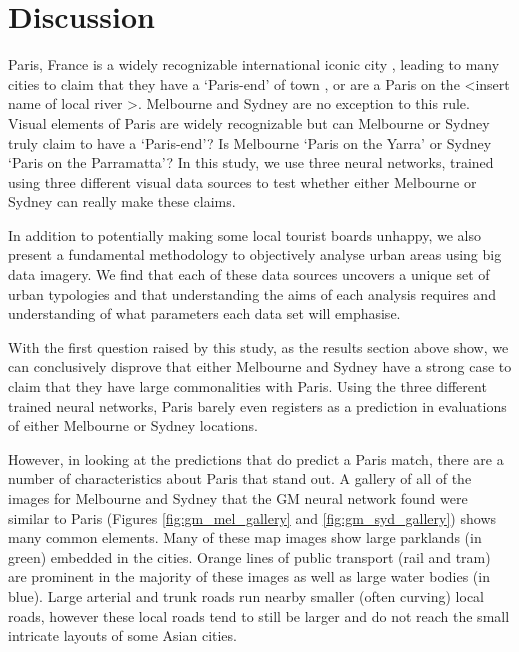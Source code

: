 \documentclass[sageh,times]{sagej}
\begin{document}
\section{Discussion}\label{sec:discussion}
Paris, France is a widely recognizable international iconic city \citep{Anholt2006}, leading to many cities to claim that they have a `Paris-end' of town \citep{Williams2010}, or are a Paris on the \textless insert name of local river \textgreater \citep{Wilden2013}. Melbourne and Sydney are no exception to this rule. Visual elements of Paris are widely recognizable \citep{Doersch2012} but can Melbourne or Sydney truly claim to have a `Paris-end'? Is Melbourne `Paris on the Yarra' or Sydney `Paris on the Parramatta'? In this study, we use three neural networks, trained using three different visual data sources to test whether either Melbourne or Sydney can really make these claims. 

In addition to potentially making some local tourist boards unhappy, we also present a fundamental methodology to objectively analyse urban areas using big data imagery. We find that each of these data sources uncovers a unique set of urban typologies and that understanding the aims of each analysis requires and understanding of what parameters each data set will emphasise.

With the first question raised by this study, as the results section above show, we can conclusively disprove that either Melbourne and Sydney have a strong case to claim that they have large commonalities with Paris. Using the three different trained neural networks, Paris barely even registers as a prediction in evaluations of either Melbourne or Sydney locations. 

However, in looking at the predictions that do predict a Paris match, there are a number of characteristics about Paris that stand out. A gallery of all of the images for Melbourne and Sydney that the GM neural network found were similar to Paris (Figures \ref{fig:gm_mel_gallery} and \ref{fig:gm_syd_gallery}) shows many common elements. Many of these map images show large parklands (in green) embedded in the cities. Orange lines of public transport (rail and tram) are prominent in the majority of these images as well as large water bodies (in blue). Large arterial and trunk roads run nearby smaller (often curving) local roads, however these local roads tend to still be larger and do not reach the small intricate layouts of some Asian cities.
\end{document}
